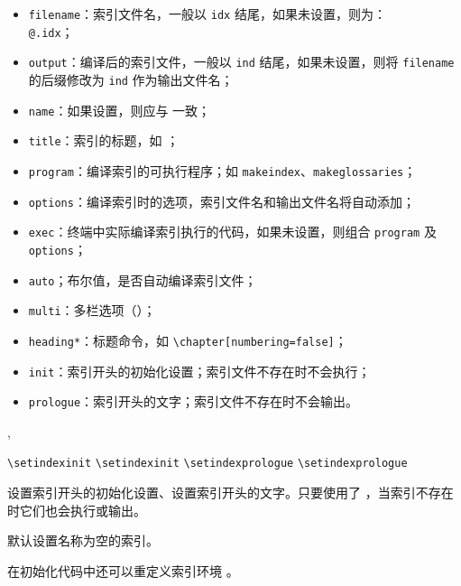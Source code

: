 \documentclass[twoside]{book}
\begin{document}
\begin{itemize}[nosep]
  \item \texttt{filename}：索引文件名，一般以 \texttt{idx} 结尾，如果未设置，则为：
  \\\texttt{@}\texttt{.idx}；
  \item \texttt{output}：编译后的索引文件，一般以 \texttt{ind} 结尾，如果未设置，则将
  \texttt{filename} 的后缀修改为 \texttt{ind} 作为输出文件名；
  \item \texttt{name}：如果设置，则应与  一致；
  \item \texttt{title}：索引的标题，如 ；
  \item \texttt{program}：编译索引的可执行程序；如 \texttt{makeindex}、\texttt{makeglossaries}；
  \item \texttt{options}：编译索引时的选项，索引文件名和输出文件名将自动添加；
  \item \texttt{exec}：终端中实际编译索引执行的代码，如果未设置，则组合 \texttt{program} 及 \texttt{options}；
  \item \texttt{auto}；布尔值，是否自动编译索引文件；
  \item \texttt{multi}：多栏选项（）；
  \item \texttt{heading*}：标题命令，如 \verb|\chapter[numbering=false]|；
  \item \texttt{init}：索引开头的初始化设置；索引文件不存在时不会执行；
  \item \texttt{prologue}：索引开头的文字；索引文件不存在时不会输出。
\end{itemize}

\smallskip 
\begin{xample}
\stopxamplecode
\xamplecode
\medskip 
\end{xample}

\begin{function}{\setindexinit,\setindexprologue}
  \begin{syntax}
    \verb|\setindexinit| 
    \verb|\setindexinit|  
    \verb|\setindexprologue| 
    \verb|\setindexprologue|  
  \end{syntax}
设置索引开头的初始化设置、设置索引开头的文字。只要使用了 ，当索引不存在时它们也会执行或输出。

默认设置名称为空的索引。

在初始化代码中还可以重定义索引环境 。
\end{function}
\end{document}
